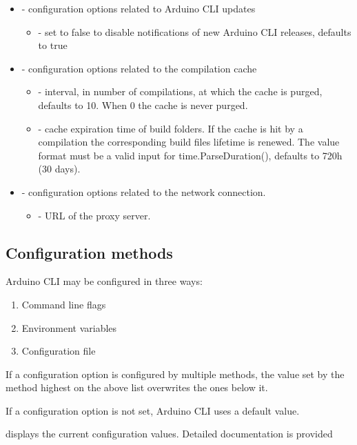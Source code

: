 \begin{itemize}
\begin{itemize}
	\end{itemize}
	\item {} - configuration options related to Arduino CLI updates
	\begin{itemize}
		\item {} - set to false to disable notifications of new Arduino CLI releases, defaults to true
	\end{itemize}
	\item {} - configuration options related to the compilation cache
	\begin{itemize}
		\item {} - interval, in number of compilations, at which the cache is purged, defaults to 10. When 0 the cache is never purged.
		\item {} - cache expiration time of build folders. If the cache is hit by a compilation the corresponding build files lifetime is renewed. The value format must be a valid input for time.ParseDuration(), defaults to 720h (30 days).
	\end{itemize}
	\item {} - configuration options related to the network connection.
	\begin{itemize}
		\item {} - URL of the proxy server.
	\end{itemize}
\end{itemize}

\subsection{Configuration methods}
Arduino CLI may be configured in three ways:
\begin{enumerate}
	\item Command line flags
	\item Environment variables
	\item Configuration file
\end{enumerate}

If a configuration option is configured by multiple methods, the value set by the method highest on the above list overwrites the ones below it.

If a configuration option is not set, Arduino CLI uses a default value.

 displays the current configuration values. Detailed documentation is provided \cite{ArduinoCLIConfig:2024}

